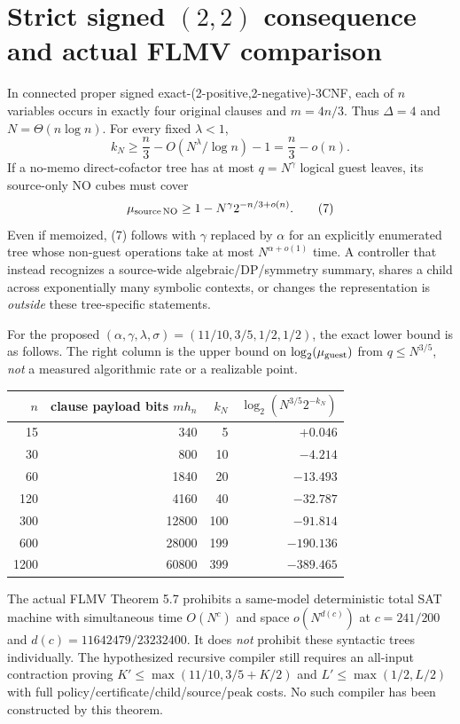 \documentclass[11pt]{article}
\begin{document}
\section{Strict signed $(2,2)$ consequence and actual FLMV comparison}
In connected proper signed exact-(2-positive,2-negative)-3CNF, each of $n$
variables occurs in exactly four original clauses and $m=4n/3$. Thus
$\Delta=4$ and $N=\Theta(n\log n)$. For every fixed $\lambda<1$,
\[
 k_N\ge \frac n3-O(N^\lambda/\log n)-1=\frac n3-o(n).       \tag{6}
\]
If a no-memo direct-cofactor tree has at most $q=N^\gamma$ logical guest
leaves, its source-only NO cubes must cover
\[
 \mu_{\rm source\,NO}\ge1-N^\gamma 2^{-n/3+o(n)}.
                                                                    \tag{7}
\]
Even if memoized, (7) follows with $\gamma$ replaced by $\alpha$ for
an explicitly enumerated tree whose non-guest operations take at most
$N^{\alpha+o(1)}$ time. A controller that instead recognizes a source-wide
algebraic/DP/symmetry summary, shares a child across exponentially many
symbolic contexts, or changes the representation is \emph{outside} these
tree-specific statements.

For the proposed $(\alpha,\gamma,\lambda,\sigma)=(11/10,3/5,1/2,1/2)$,
the exact lower bound is as follows. The right column is the upper bound
on $\log_2(\mu_{\rm guest})$ from $q\le N^{3/5}$, \emph{not} a measured
algorithmic rate or a realizable point.
\begin{center}\begin{tabular}{rrrr}
\toprule
$n$ & clause payload bits $m h_n$ & $k_N$ & $\log_2(N^{3/5}2^{-k_N})$\\
\midrule
15 & 340 & 5 & $+0.046$\\
30 & 800 & 10 & $-4.214$\\
60 & 1840 & 20 & $-13.493$\\
120 & 4160 & 40 & $-32.787$\\
300 & 12800 & 100 & $-91.814$\\
600 & 28000 & 199 & $-190.136$\\
1200 & 60800 & 399 & $-389.465$\\
\bottomrule
\end{tabular}\end{center}
The actual FLMV Theorem 5.7 prohibits a same-model deterministic total SAT
machine with simultaneous time $O(N^{c})$ and space $o(N^{d(c)})$ at
$c=241/200$ and $d(c)=11642479/23232400$. It does \emph{not} prohibit
these syntactic trees individually. The hypothesized recursive compiler still
requires an all-input contraction proving
$K'\le\max(11/10,3/5+K/2)$ and
$L'\le\max(1/2,L/2)$ with full policy/certificate/child/source/peak costs.
No such compiler has been constructed by this theorem.
\end{document}
